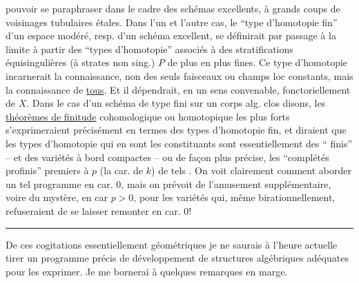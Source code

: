 pouvoir se paraphraser dans le cadre des schémas excellents, à grands coups de voisinages tubulaires étales. Dans l'un et l'autre cas, le ``type d'homotopie fin'' d'un espace modéré, resp. d'un schéma excellent, se définirait par passage à la limite à partir des ``types d'homotopie'' associés à des stratifications équisingulières (à strates non sing.) $P$ de plus en plus fines. Ce type d'homotopie  incarnerait la connaissance, non des seuls faisceaux ou champs loc constants, mais  la connaissance de \uline{tous}. Et il dépendrait, en un sens convenable, fonctoriellement de $X$. Dans le cas d'un schéma de type fini sur un corps alg. clos disons, les \uline{théorèmes de finitude} cohomologique ou homotopique les plus forts s'exprimeraient précisément en termes des types d'homotopie fin, et diraient que les types d'homotopie  qui en sont les  constituants sont essentiellement des `` finis'' -- et  des variétés à bord compactes -- ou de façon plus précise,
les ``complétés profinis''  premiers à $p$ (la car. de $k$) de tels . On voit clairement comment aborder un tel programme en car. $0$, mais on prévoit de l'amusement supplémentaire, voire du mystère, en car $p>0$, pour les variétés qui, même birationnellement, refuseraient de se laisser remonter en car. $0$!

\begin{center}\rule{0.18\linewidth}{0.4pt}\end{center}

De ces cogitations essentiellement géométriques je ne saurais à l'heure actuelle tirer un programme précis de développement de structures algébriques adéquates pour les exprimer. Je me bornerai à quelques remarques en marge.

